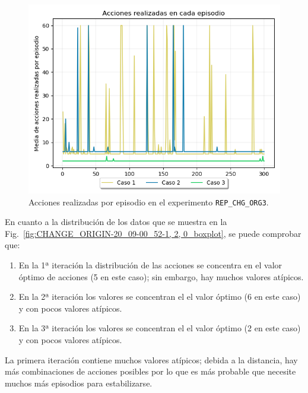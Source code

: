  \begin{figure}
    \centering
    \includegraphics[scale=0.4]{cap5_experimentacion/images/CHANGE_ORIGIN-20_09-00_54-1, 2, 0_acciones.png}
    \caption{Acciones realizadas por episodio en el experimento \texttt{REP\_CHG\_ORG3}.}
    \label{fig:CHANGE_ORIGIN-20_09-00_54-1, 2, 0_acciones}
\end{figure}

En cuanto a la distribución de los datos que se muestra en la Fig.~\ref{fig:CHANGE_ORIGIN-20_09-00_52-1, 2, 0_boxplot}, se puede comprobar que:
\begin{enumerate}
    \item En la 1ª iteración la distribución de las acciones se concentra en el valor óptimo de acciones (5 en este caso); sin embargo, hay muchos valores atípicos.
    \item En la 2ª iteración los valores se concentran el el valor óptimo (6 en este caso) y con pocos valores atípicos.
    \item En la 3ª iteración los valores se concentran el el valor óptimo (2 en este caso) y con pocos valores atípicos.  
\end{enumerate}

La primera iteración contiene muchos valores atípicos; debida a la distancia, hay más combinaciones de acciones posibles por lo que es más probable que necesite muchos más episodios para estabilizarse. \\

